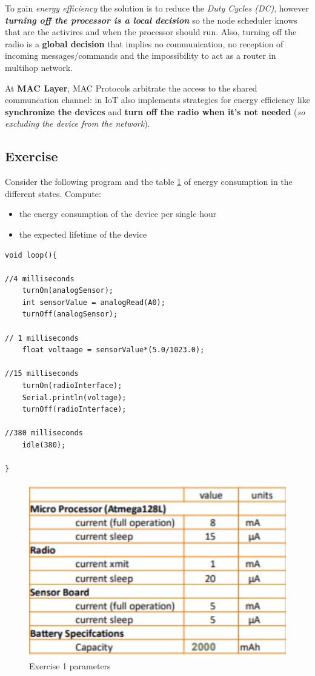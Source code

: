 \documentclass[10pt,a4paper]{report}
\theoremstyle{definition}
\begin{document}
To gain \textit{energy efficiency} the solution is to reduce the \textit{Duty Cycles (DC)}, however \textit{\textbf{turning off the processor is a local decision}} so the node scheduler knows that are the activires and when the processor should run. Also, turning off the radio is a \textbf{global decision} that implies no communication, no reception of incoming messages/commands and the impossibility to act as a router in multihop network.

At \textbf{MAC Layer}, MAC Protocols arbitrate the access to the shared communcation channel: in IoT also implements strategies for energy efficiency like \textbf{synchronize the devices} and \textbf{turn off the radio when it's not needed} (\textit{so excluding the device from the network}).

\subsection{Exercise}\label{sec:exercise}
Consider the following program and the table \ref{ex1-table-dc} of energy consumption in the different states. Compute:
\begin{itemize}
	\item the energy consumption of the device per single hour
	\item the expected lifetime of the device
\end{itemize}
\begin{lstlisting}
void loop(){

//4 milliseconds
	turnOn(analogSensor);
	int sensorValue = analogRead(A0);
	turnOff(analogSensor);
	
// 1 milliseconds
	float voltaage = sensorValue*(5.0/1023.0);

//15 milliseconds
	turnOn(radioInterface);
	Serial.println(voltage);
	turnOff(radioInterface);
	
//380 milliseconds
	idle(380);

}
\end{lstlisting}

\begin{figure}[h]
	\centering\includegraphics[scale=0.45]{images/Pasted image 20230508152346.png}
	\caption{Exercise 1 parameters}
	\label{ex1-table-dc}
\end{figure}
\end{document}
